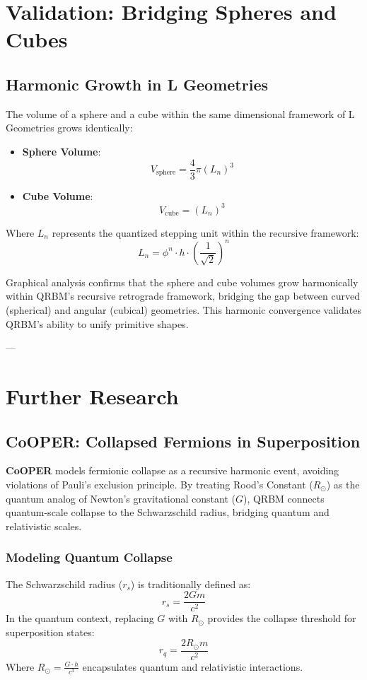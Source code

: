 \documentclass{article}
\begin{document}
\section*{Validation: Bridging Spheres and Cubes}

\subsection*{Harmonic Growth in L Geometries}
The volume of a sphere and a cube within the same dimensional framework of L Geometries grows identically:
\begin{itemize}
    \item \textbf{Sphere Volume}:
    \[
    V_{\text{sphere}} = \frac{4}{3} \pi (L_n)^3
    \]
    \item \textbf{Cube Volume}:
    \[
    V_{\text{cube}} = (L_n)^3
    \]
\end{itemize}

Where \(L_n\) represents the quantized stepping unit within the recursive framework:
\[
L_n = \phi^n \cdot h \cdot \left( \frac{1}{\sqrt{2}} \right)^n
\]

Graphical analysis confirms that the sphere and cube volumes grow harmonically within QRBM’s recursive retrograde framework, bridging the gap between curved (spherical) and angular (cubical) geometries. This harmonic convergence validates QRBM's ability to unify primitive shapes.

---

\section*{Further Research}

\subsection*{CoOPER: Collapsed Fermions in Superposition}
\textbf{CoOPER} models fermionic collapse as a recursive harmonic event, avoiding violations of Pauli’s exclusion principle. By treating Rood’s Constant (\(R_\odot\)) as the quantum analog of Newton’s gravitational constant (\(G\)), QRBM connects quantum-scale collapse to the Schwarzschild radius, bridging quantum and relativistic scales.

\subsubsection*{Modeling Quantum Collapse}
The Schwarzschild radius (\(r_s\)) is traditionally defined as:
\[
r_s = \frac{2Gm}{c^2}
\]
In the quantum context, replacing \(G\) with \(R_\odot\) provides the collapse threshold for superposition states:
\[
r_q = \frac{2R_\odot m}{c^2}
\]
Where \(R_\odot = \frac{G \cdot h}{c^3}\) encapsulates quantum and relativistic interactions.
\end{document}
